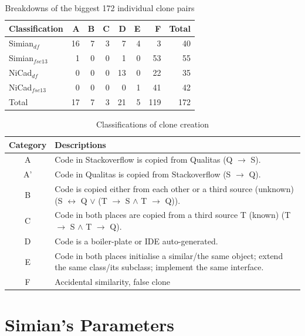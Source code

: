 \documentclass{IEEEtran}
\begin{document}
\begin{table}[H]
	\centering
	\caption{Breakdowns of the biggest 172 individual clone pairs}
	\label{tab:classification_breakdown}
	\begin{tabular}{|l|r|r|r|r|r|r|r|}
		\hline 
		Classification & A & B & C & D & E & F & Total \\ 
		\hline 
		Simian$_{df}$ & 16 & 7 & 3 & 7 & 4 & 3 & 40 \\ 
		\hline
		Simian$_{fse13}$ & 1 & 0 & 0 & 1 & 0 & 53 & 55 \\
		\hline
		NiCad$_{df}$ & 0 & 0 & 0 & 13 & 0 & 22 & 35 \\
		\hline
		NiCad$_{fse13}$ & 0 & 0 & 0 & 0 & 1 & 41 & 42 \\
		\hline
		Total & 17 & 7 & 3 & 21 & 5 & 119 & 172 \\
		\hline
	\end{tabular} 
\end{table}

\begin{table}[H]
	\centering
	\caption{Classifications of clone creation}
	\label{tab:classification_scheme}
	\begin{tabular}{|c|p{13cm}|}
		\hline 
		Category & Descriptions \\ 
		\hline 
		A & Code in Stackoverflow is copied from Qualitas (Q $\rightarrow$ S). \\ 
		\hline 
		A' & Code in Qualitas is copied from Stackoverflow (S $\rightarrow$ Q). \\ 
		\hline 
		B & Code is copied either from each other or a third source (unknown) (S $\leftrightarrow$ Q $\vee$ (T $\rightarrow$ S $\wedge$ T $\rightarrow$ Q)).
		\\ 
		\hline 
		C & Code in both places are copied from a third source T (known) (T $\rightarrow$ S $\wedge$ T $\rightarrow$ Q).
		\\ 
		\hline 
		D & Code is a boiler-plate or IDE auto-generated.
		\\ 
		\hline 
		E & Code in both places initialise a similar/the same object; extend the same class/its subclass; implement the same interface.
		\\ 
		\hline 
		F & Accidental similarity, false clone \\ 
		\hline 
	\end{tabular} 
\end{table}

\newpage

\section*{Simian's Parameters}
\end{document}
